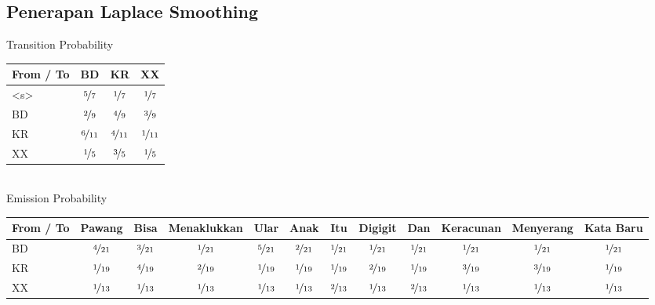 \documentclass[paper=a4, fontsize=11pt]{scrartcl} %
\numberwithin{equation}{section} %
\numberwithin{figure}{section} %
\numberwithin{table}{section} %
\begin{document}
\subsection{Penerapan Laplace Smoothing}

Transition Probability \\
\begin{tabular}{ | l | c | c | c | }
	\hline
	From / To & BD & KR & XX \\ \hline
	<s> & $\nicefrac{5}{7}$ & $\nicefrac{1}{7}$ & $\nicefrac{1}{7}$ \\ \hline
	BD & $\nicefrac{2}{9}$ & $\nicefrac{4}{9}$ & $\nicefrac{3}{9}$ \\ \hline
	KR & $\nicefrac{6}{11}$ & $\nicefrac{4}{11}$ & $\nicefrac{1}{11}$ \\ \hline
	XX & $\nicefrac{1}{5}$ & $\nicefrac{3}{5}$ & $\nicefrac{1}{5}$ \\ \hline
\end{tabular} \\ [8pt]

Emission Probability \\
\begin{tabular}{ | l | c | c | c | c | c | c | c | c | c | c | c |}
	\hline
	From / To & Pawang & Bisa & {\tiny Menaklukkan} & Ular & Anak & Itu & {\tiny Digigit} & Dan & {\tiny Keracunan} & {\tiny Menyerang} & {\tiny Kata Baru}\\ \hline
	BD & $\nicefrac{4}{21}$ & $\nicefrac{3}{21}$ & $\nicefrac{1}{21}$ & $\nicefrac{5}{21}$ & $\nicefrac{2}{21}$ & $\nicefrac{1}{21}$ & $\nicefrac{1}{21}$ & $\nicefrac{1}{21}$ & $\nicefrac{1}{21}$ & $\nicefrac{1}{21}$ & $\nicefrac{1}{21}$ \\ \hline
	KR & $\nicefrac{1}{19}$ & $\nicefrac{4}{19}$ & $\nicefrac{2}{19}$ & $\nicefrac{1}{19}$ & $\nicefrac{1}{19}$ & $\nicefrac{1}{19}$ & $\nicefrac{2}{19}$ & $\nicefrac{1}{19}$ & $\nicefrac{3}{19}$ & $\nicefrac{3}{19}$ & $\nicefrac{1}{19}$ \\ \hline
	XX & $\nicefrac{1}{13}$ & $\nicefrac{1}{13}$ & $\nicefrac{1}{13}$ & $\nicefrac{1}{13}$ & $\nicefrac{1}{13}$ & $\nicefrac{2}{13}$ & $\nicefrac{1}{13}$ & $\nicefrac{2}{13}$ & $\nicefrac{1}{13}$ & $\nicefrac{1}{13}$ & $\nicefrac{1}{13}$ \\ \hline
\end{tabular} \\ [8pt]
\end{document}
